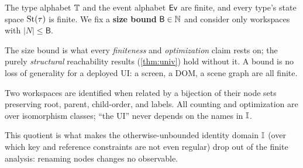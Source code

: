 \documentclass[../uxoxo-main]{subfiles}
\begin{document}
\begin{assumption}\label{ass:finite}
The type alphabet $\mathbb{T}$ and the event alphabet $\mathsf{Ev}$ are finite, and every
type's state space $\mathrm{St}(\tau)$ is finite. We fix a \textbf{size bound}
$\mathsf{B}\in\mathbb{N}$ and consider only workspaces with $\lvert N\rvert\le\mathsf B$.
\end{assumption}

The size bound is what every \emph{finiteness} and \emph{optimization} claim
rests on; the purely \emph{structural} reachability results
(\cref{thm:univ}) hold without it. A bound is no loss of generality for a
deployed UI: a screen, a DOM, a scene graph are all finite.

\begin{assumption}\label{ass:iso}
Two workspaces are identified when related by a bijection of their node sets
preserving root, parent, child-order, and labels. All counting and optimization
are over isomorphism classes; ``the UI'' never depends on the names in $\mathbb{I}$.
\end{assumption}

This quotient is what makes the otherwise-unbounded identity domain $\mathbb{I}$
(over which key and reference constraints are not even regular) drop out of the
finite analysis: renaming nodes changes no observable.


\end{document}
